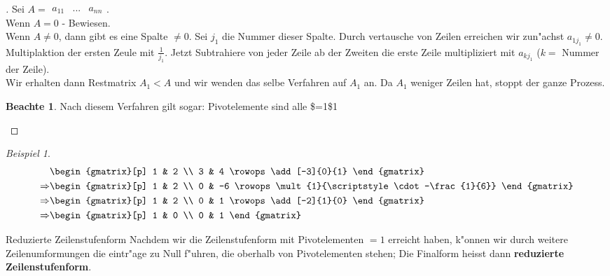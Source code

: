 \documentclass[11pt]{article}
\theoremstyle{remark}
\newtheorem{exa}{Beispiel}[section]
\theoremstyle{definition}
\newtheorem*{notte}{Beachte}
\theoremstyle{remark}
\begin{document}
\begin{proof}[] \label{}
Sei \(A=\begin{matrix}a_{11}&...&a_{nn}\end{matrix}\). \\
Wenn \(A=0\) - Bewiesen. \\
Wenn \(A\not=0\), dann gibt es eine Spalte \(\not= 0\). Sei
\(j_1\) die Nummer dieser Spalte. Durch vertausche von Zeilen erreichen wir
zun"achst \(a_{1j_1}\not= 0\). Multiplaktion der ersten Zeule mit
\(\frac{1}{j_1}\). Jetzt Subtrahiere von jeder Zeile ab der Zweiten die erste
Zeile multipliziert mit \(a_{kj_1}\) (\(k=\) Nummer der Zeile). \\

Wir erhalten dann Restmatrix \(A_1<A\) und wir wenden das selbe Verfahren auf
\(A_1\) an. Da \(A_1\) weniger Zeilen hat, stoppt der ganze Prozess.

\begin{notte}
Nach diesem Verfahren gilt sogar: Pivotelemente sind alle \$=1\$1
\end{notte}
\end{proof}


\begin{exa}
\begin{align*}
  & \begin{gmatrix}[p]
      1 & 2 \\
      3 & 4
      \rowops
      \add[-3]{0}{1}
    \end{gmatrix} \\
  \Rightarrow & \begin{gmatrix}[p]
      1 & 2 \\
      0 & -6
      \rowops
      \mult{1}{\scriptstyle\cdot-\frac{1}{6}}
    \end{gmatrix} \\
  \Rightarrow & \begin{gmatrix}[p]
      1 & 2 \\
      0 & 1
      \rowops
      \add[-2]{1}{0}
    \end{gmatrix} \\
  \Rightarrow & \begin{gmatrix}[p]
      1 & 0 \\
      0 & 1
    \end{gmatrix}
\end{align*}
\end{exa}

\begin{definition}{Reduzierte Zeilenstufenform}{}
Nachdem wir die Zeilenstufenform mit Pivotelementen \(=1\) erreicht haben, k"onnen
wir durch weitere Zeilenumformungen die eintr"age zu Null f"uhren, die oberhalb
von Pivotelementen stehen; Die Finalform heisst dann \textbf{reduzierte
Zeilenstufenform}.
\end{definition}
\end{document}
